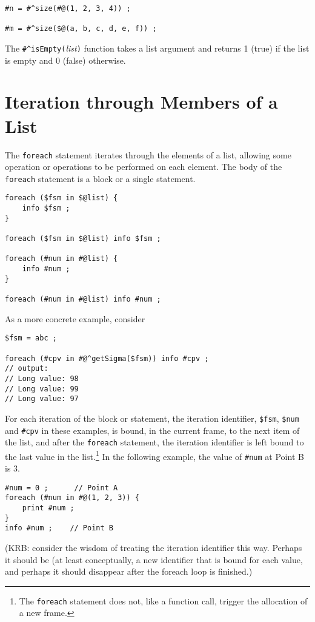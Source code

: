 \begin{Verbatim}
#n = #^size(#@(1, 2, 3, 4)) ;

#m = #^size($@(a, b, c, d, e, f)) ;
\end{Verbatim}

The \verb!#^isEmpty(!\emph{list}\verb!)! function takes a list argument and
returns 1 (true) if the list is empty and 0 (false) otherwise.

\section{Iteration through Members of a List}


The \texttt{foreach} statement iterates through the elements of a list, allowing
some operation or operations to be performed on each element.  The body of
the \texttt{foreach} statement is a block or a single statement.

\begin{Verbatim}
foreach ($fsm in $@list) {
    info $fsm ;
}

foreach ($fsm in $@list) info $fsm ;

foreach (#num in #@list) {
    info #num ;
}

foreach (#num in #@list) info #num ;
\end{Verbatim}

\noindent
As a more concrete example, consider

\begin{Verbatim}
$fsm = abc ;

foreach (#cpv in #@^getSigma($fsm)) info #cpv ;
// output:
// Long value: 98
// Long value: 99
// Long value: 97
\end{Verbatim}

For each iteration of the block or statement, the iteration identifier,
\verb!$fsm!, \verb!$num! and \verb!#cpv! in these examples, is bound, in
the current frame, to the next item of the list, and after the
\texttt{foreach} statement, the iteration identifier is left bound to the
last value in the list.\footnote{The \texttt{foreach} statement does not,
like a function call, trigger the allocation of a new frame.}  In the
following example, the value of \verb!#num! at Point B is 3.

\begin{Verbatim}
#num = 0 ;      // Point A
foreach (#num in #@(1, 2, 3)) {
	print #num ;
}
info #num ;    // Point B
\end{Verbatim}

(KRB:  consider the wisdom of treating the iteration identifier this
way.  Perhaps it should be (at least conceptually, a new identifier that
is bound for each value, and perhaps it should disappear after the
foreach loop is finished.)

